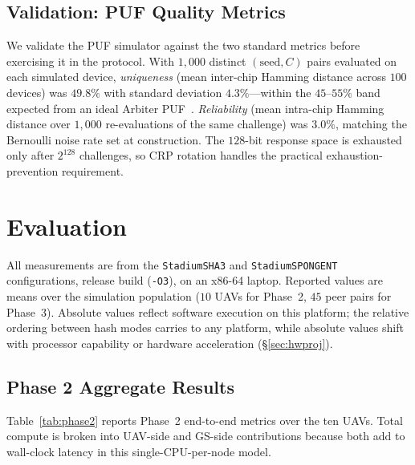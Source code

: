 \documentclass[conference,a4paper,10pt]{IEEEtran}
\begin{document}
\subsection{Validation: PUF Quality Metrics}
\label{sec:puf_quality}
We validate the PUF simulator against the two standard metrics
before exercising it in the protocol. With $1{,}000$ distinct
$(\mathrm{seed}, C)$ pairs evaluated on each simulated device,
\emph{uniqueness} (mean inter-chip Hamming distance across $100$
devices) was $49.8\%$ with standard deviation $4.3\%$---within the
$45$--$55\%$ band expected from an ideal Arbiter
PUF~\cite{arbiter_puf_iot}. \emph{Reliability} (mean intra-chip
Hamming distance over $1{,}000$ re-evaluations of the same
challenge) was $3.0\%$, matching the Bernoulli noise rate set at
construction. The $128$-bit response space is exhausted only after
$2^{128}$ challenges, so CRP rotation handles the practical
exhaustion-prevention requirement.


\section{Evaluation}
\label{sec:evaluation}

All measurements are from the \texttt{StadiumSHA3} and
\texttt{StadiumSPONGENT} configurations, release build
(\texttt{-O3}), on an x86-64 laptop. Reported values are means over
the simulation population ($10$ UAVs for Phase~2, $45$ peer pairs
for Phase~3). Absolute values reflect software execution on this
platform; the relative ordering between hash modes carries to any
platform, while absolute values shift with processor capability or
hardware acceleration (\S\ref{sec:hwproj}).

\subsection{Phase 2 Aggregate Results}
\label{sec:p2agg}
Table~\ref{tab:phase2} reports Phase~2 end-to-end metrics over the
ten UAVs. Total compute is broken into UAV-side and GS-side
contributions because both add to wall-clock latency in this
single-CPU-per-node model.
\end{document}
